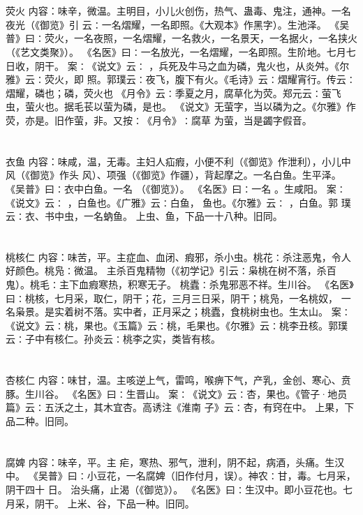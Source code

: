 \documentclass[12pt,UTF8]{ctexbook}
\begin{document}
\chapter{}荧火
内容：味辛，微温。主明目，小儿火创伤，热气、蛊毒、鬼注，通神。一名夜光（《御览》引 
云∶一名熠耀，一名即照。《大观本》作黑字）。生池泽。 
《吴普》曰∶荧火，一名夜照，一名熠耀，一名救火，一名景天，一名据火，一名挟火 
（《艺文类聚》）。 
《名医》曰∶一名放光，一名熠耀，一名即照。生阶地。七月七日收，阴干。 
案∶《说文》云∶ ，兵死及牛马之血为磷，鬼火也，从炎舛。《尔雅》云∶荧火，即 
照。郭璞云∶夜飞，腹下有火。《毛诗》云∶熠耀宵行。传云∶熠耀，磷也；磷，荧火也 
《月令》云∶季夏之月，腐草化为荧。郑元云∶萤飞虫，萤火也。据毛苌以萤为磷，是也。 
《说文》无萤字，当以磷为之。《尔雅》作荧，亦是。旧作萤，非。又按∶《月令》∶腐草 
为萤，当是蠲字假音。 


\chapter{}衣鱼
内容：味咸，温，无毒。主妇人疝瘕，小便不利（《御览》作泄利），小儿中风（《御览》作头 
风）、项强（《御览》作疆），背起摩之。一名白鱼。生平泽。 
《吴普》曰∶衣中白鱼。一名 （《御览》）。 
《名医》曰∶一名 。生咸阳。 
案∶《说文》云∶ ，白鱼也。《广雅》云∶白鱼， 鱼也。《尔雅》云∶ ，白鱼。郭 
璞云∶衣、书中虫，一名蚋鱼。 
上虫、鱼，下品一十八种。旧同。 


\chapter{}桃核仁
内容：味苦，平。主症血、血闭、瘕邪，杀小虫。桃花∶杀注恶鬼，令人好颜色。桃凫∶微温。 
主杀百鬼精物（《初学记》引云∶枭桃在树不落，杀百鬼）。桃毛∶主下血瘕寒热，积寒无子。 
桃蠹∶杀鬼邪恶不祥。生川谷。 
《名医》曰∶桃核，七月采，取仁，阴干；花，三月三日采，阴干；桃凫，一名桃奴， 
一名枭景。是实着树不落。实中者，正月采之；桃蠹，食桃树虫也。生太山。 
案∶《说文》云∶桃，果也。《玉篇》云∶桃，毛果也。《尔雅》云∶桃李丑核。郭璞 
云∶子中有核仁。孙炎云∶桃李之实，类皆有核。 


\chapter{}杏核仁
内容：味甘，温。主咳逆上气，雷鸣，喉痹下气，产乳，金创、寒心、贲豚。生川谷。 
《名医》曰∶生晋山。 
案∶《说文》云∶杏，果也。《管子·地员篇》云∶五沃之土，其木宜杏。高诱注《淮南 
子》云∶杏，有窍在中。 
上果，下品二种。旧同。 


\chapter{}腐婢
内容：味辛，平。主 疟，寒热、邪气，泄利，阴不起，病酒，头痛。生汉中。 
《吴普》曰∶小豆花，一名腐婢（旧作付月，误）。神农∶甘，毒。七月采，阴干四十 
日。 
治头痛，止渴（《御览》）。 
《名医》曰∶生汉中。即小豆花也。七月采，阴干。 
上米、谷，下品一种。旧同。 
\end{document}
